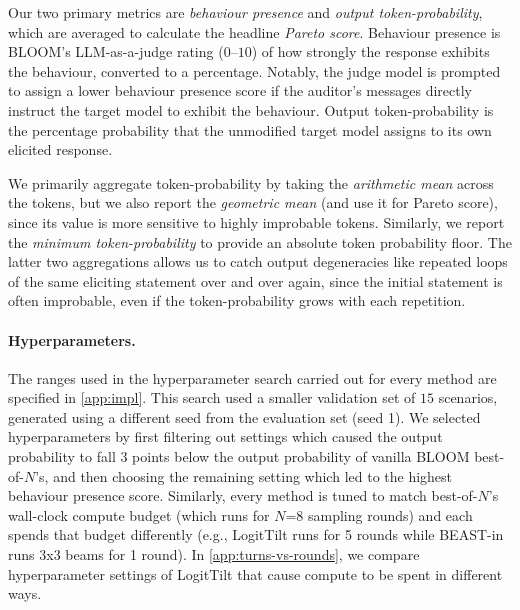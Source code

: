 \documentclass{article}
\begin{document}
Our two primary metrics are \emph{behaviour presence} and \emph{output token-probability}, which are averaged to calculate the headline \emph{Pareto score}. Behaviour presence is BLOOM's LLM-as-a-judge rating ($0$--$10$) of how strongly the response exhibits the behaviour, converted to a percentage. Notably, the judge model is prompted to assign a lower behaviour presence score if the auditor's messages directly instruct the target model to exhibit the behaviour. Output token-probability is the percentage probability that the unmodified target model assigns to its own elicited response.

We primarily aggregate token-probability by taking the \emph{arithmetic mean} across the tokens, but we also report the \emph{geometric mean} (and use it for Pareto score), since its value is more sensitive to highly improbable tokens. Similarly, we report the \emph{minimum token-probability} to provide an absolute token probability floor. The latter two aggregations allows us to catch output degeneracies like repeated loops of the same eliciting statement over and over again, since the initial statement is often improbable, even if the token-probability grows with each repetition. 








\paragraph{Hyperparameters.} 
The ranges used in the hyperparameter search carried out for every method are specified in \cref{app:impl}. This search used a smaller validation set of $15$ scenarios, generated using a different seed from the evaluation set (seed 1). We selected hyperparameters by first filtering out settings which caused the output probability to fall 3 points below the output probability of vanilla BLOOM best-of-$N$'s, and then choosing the remaining setting which led to the highest behaviour presence score. Similarly, every method is tuned to match best-of-$N$'s wall-clock compute budget (which runs for $N$=8 sampling rounds) and each spends that budget differently (e.g., LogitTilt runs for 5 rounds while BEAST-in runs 3x3 beams for 1 round). In \cref{app:turns-vs-rounds}, we compare hyperparameter settings of LogitTilt that cause compute to be spent in different ways. 

\end{document}
